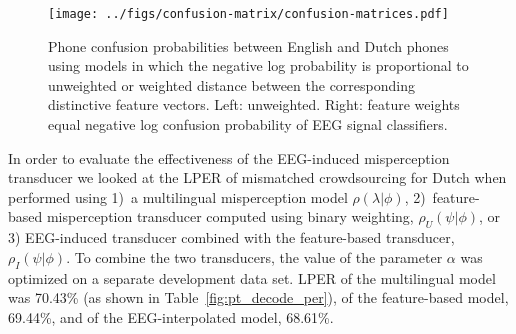 \begin{figure}
  \centerline{
    \texttt{[image: ../figs/confusion-matrix/confusion-matrices.pdf]}
  }
    \vspace*{-0.3cm}
  \caption{Phone confusion probabilities between English and Dutch
    phones using models in which the negative log
    probability is proportional to unweighted or weighted
    distance between the corresponding
    distinctive feature vectors.  Left: unweighted.
    Right: feature weights equal negative log confusion
    probability of EEG signal classifiers.}
  \label{fig:eeg_confusions}
\end{figure}

In order to evaluate the effectiveness of the EEG-induced misperception 
transducer we looked at the LPER of mismatched crowdsourcing
for Dutch when performed using 1)~a multilingual misperception
model $\rho(\lambda|\phi)$,
2)~feature-based misperception transducer computed using binary 
weighting, $\rho_U(\psi|\phi)$, or 3) EEG-induced transducer combined with 
the feature-based transducer, $\rho_I(\psi|\phi)$. To combine the two 
transducers, the value of the parameter $\alpha$ was optimized on a 
separate development data set.
LPER of the multilingual model was 70.43\% {\color{blue} (as shown in Table~\ref{fig:pt_decode_per})}, of the feature-based model,
69.44\%, and of the EEG-interpolated model, 68.61\%.



